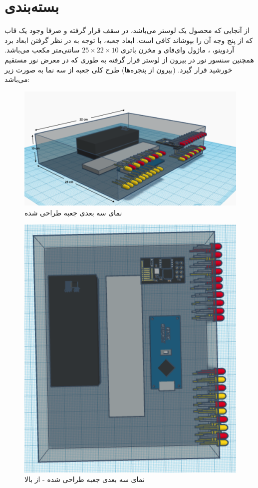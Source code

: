 \documentclass[12pt,a4paper]{article}
\begin{document}
	\newpage
\section*{بسته‌بندی‌}
از آنجایی که محصول یک لوستر می‌باشد، در سقف قرار گرفته و صرفا وجود یک قاب که از پنج وجه آن را بپوشاند کافی است. ابعاد جعبه، با توجه به در نظر گرفتن ابعاد برد آردوینو، ، ماژول وای‌فای و مخزن باتری
 $25\times22\times10$ 
 سانتی‌متر مکعب می‌باشد. همچنین سنسور نور در بیرون از لوستر قرار گرفته به طوری که در معرض نور مستقیم خورشید قرار گیرد. (بیرون از پنجره‌ها) طرح کلی جعبه از سه نما به صورت زیر می‌باشد:
 	\begin{figure}[H]
 	\centering
 	\includegraphics[scale=0.5]{figs/nama-roberoo.png}
 	\caption{
 		نمای سه بعدی جعبه طراحی شده
 	}
 	\label{fig:schema13}
 	\end{figure}
 		\begin{figure}[H]
 		\centering
 		\includegraphics[scale=0.5]{figs/nama-bala.png}
 		\caption{
 			نمای سه بعدی جعبه طراحی شده - از بالا
 		}
 		\label{fig:schema13}
 	\end{figure}
\end{document}

